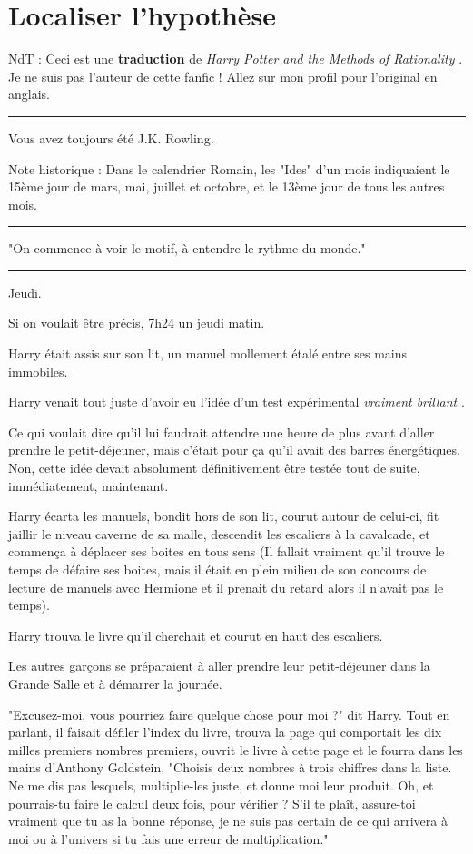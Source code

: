 
\chapter{Localiser l'hypothèse}

NdT : Ceci est une \textbf{traduction}  de \emph{Harry Potter and the Methods of Rationality} . Je ne suis pas l'auteur de cette fanfic ! Allez sur mon profil pour l'original en anglais.
\par\noindent\rule{\textwidth}{0.4pt}
Vous avez toujours été J.K. Rowling.

Note historique : Dans le calendrier Romain, les "Ides" d'un mois indiquaient le 15ème jour de mars, mai, juillet et octobre, et le 13ème jour de tous les autres mois.
\par\noindent\rule{\textwidth}{0.4pt}
"On commence à voir le motif, à entendre le rythme du monde."
\par\noindent\rule{\textwidth}{0.4pt}
Jeudi.

Si on voulait être précis, 7h24 un jeudi matin.

Harry était assis sur son lit, un manuel mollement étalé entre ses mains immobiles.

Harry venait tout juste d'avoir eu l'idée d'un test expérimental \emph{vraiment brillant} .

Ce qui voulait dire qu'il lui faudrait attendre une heure de plus avant d'aller prendre le petit-déjeuner, mais c'était pour ça qu'il avait des barres énergétiques. Non, cette idée devait absolument définitivement être testée tout de suite, immédiatement, maintenant.

Harry écarta les manuels, bondit hors de son lit, courut autour de celui-ci, fit jaillir le niveau caverne de sa malle, descendit les escaliers à la cavalcade, et commença à déplacer ses boites en tous sens (Il fallait vraiment qu'il trouve le temps de défaire ses boites, mais il était en plein milieu de son concours de lecture de manuels avec Hermione et il prenait du retard alors il n'avait pas le temps).

Harry trouva le livre qu'il cherchait et courut en haut des escaliers.

Les autres garçons se préparaient à aller prendre leur petit-déjeuner dans la Grande Salle et à démarrer la journée.

"Excusez-moi, vous pourriez faire quelque chose pour moi ?" dit Harry. Tout en parlant, il faisait défiler l'index du livre, trouva la page qui comportait les dix milles premiers nombres premiers, ouvrit le livre à cette page et le fourra dans les mains d'Anthony Goldstein. "Choisis deux nombres à trois chiffres dans la liste. Ne me dis pas lesquels, multiplie-les juste, et donne moi leur produit. Oh, et pourrais-tu faire le calcul deux fois, pour vérifier ? S'il te plaît, assure-toi vraiment que tu as la bonne réponse, je ne suis pas certain de ce qui arrivera à moi ou à l'univers si tu fais une erreur de multiplication."

